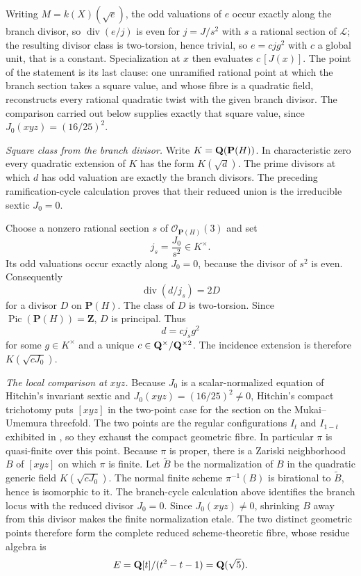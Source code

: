 Writing \(M=k(X)(\sqrt e)\), the odd
valuations of \(e\) occur exactly along the branch divisor, so
\(\operatorname{div}(e/j)\) is even for \(j=J/s^2\) with \(s\) a rational
section of \(\mathcal L\); the resulting divisor class is two-torsion, hence
trivial, so \(e=cjg^2\) with \(c\) a global unit, that is a constant.
Specialization at \(x\) then evaluates \(c\,[J(x)]\).  The point of the
statement is its last clause: one unramified rational point at which the
branch section takes a square value, and whose fibre is a quadratic field,
reconstructs every rational quadratic twist with the given branch divisor.
The comparison carried out below supplies exactly that square value, since
\(J_0(xyz)=(16/25)^2\).

\emph{Square class from the branch divisor.}
Write \(K=\mathbf Q(\mathbf P(H))\).  In characteristic zero every quadratic
extension of \(K\) has the form \(K(\sqrt d)\).  The prime divisors at
which \(d\) has odd valuation are exactly the branch divisors.  The
preceding ramification-cycle calculation proves that their reduced union is
the irreducible sextic \(J_0=0\).

Choose a nonzero rational section \(s\) of
\(\mathcal O_{\mathbf P(H)}(3)\) and set
\[
 j_s=\frac{J_0}{s^2}\in K^\times.
\]
Its odd valuations occur exactly along \(J_0=0\), because the divisor of
\(s^2\) is even.  Consequently
\[
 \operatorname{div}(d/j_s)=2D
\]
for a divisor \(D\) on \(\mathbf P(H)\).  The class of \(D\) is
two-torsion.  Since
\(\operatorname{Pic}(\mathbf P(H))=\mathbf Z\), \(D\) is principal.
Thus
\[
 d=cj_sg^2
\]
for some \(g\in K^\times\) and a unique
\(c\in\mathbf Q^\times/\mathbf Q^{\times2}\).  The incidence extension is therefore
\(K(\sqrt{cJ_0})\).

\emph{The local comparison at \(xyz\).}
Because \(J_0\) is a scalar-normalized equation of Hitchin's invariant sextic
and \(J_0(xyz)=(16/25)^2\ne0\), Hitchin's compact trichotomy
\cite[\S\S3--4, 9, Theorem~5]{HitchinBundles} puts \([xyz]\) in the two-point
case for the section on the Mukai--Umemura threefold.  The two points are the
regular configurations \(I_t\) and \(I_{1-t}\) exhibited in
\cite[\S\S3, 7--9]{HitchinIcosahedron}, so they exhaust the compact geometric
fibre.  In particular \(\pi\) is quasi-finite over this point.
Because \(\pi\) is proper, there is a Zariski neighborhood
\(B\) of \([xyz]\) on which \(\pi\) is finite.  Let
\(\widetilde B\) be the normalization of \(B\) in the quadratic generic
field \(K(\sqrt{cJ_0})\).  The normal finite scheme
\(\pi^{-1}(B)\) is birational to \(\widetilde B\), hence is isomorphic to
it.  The branch-cycle calculation above identifies the branch locus with
the reduced divisor \(J_0=0\).  Since \(J_0(xyz)\ne0\), shrinking \(B\)
away from this divisor
makes the finite normalization etale.  The two distinct geometric points
therefore form the complete reduced scheme-theoretic fibre, whose residue
algebra is
\[
 E=\mathbf Q[t]/(t^2-t-1)=\mathbf Q(\sqrt5).
\]

